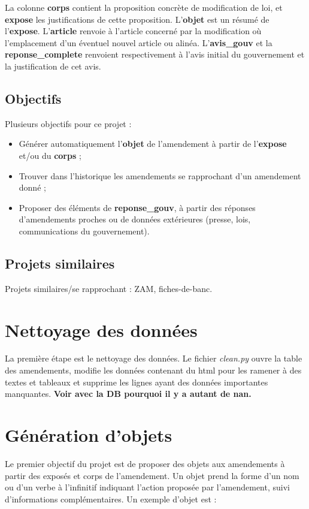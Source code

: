 \documentclass{article}
\begin{document}
La colonne \textbf{corps} contient la proposition concrète de modification de loi, et \textbf{expose} les justifications de cette proposition. L'\textbf{objet} est un résumé de l'\textbf{expose}. 
L'\textbf{article} renvoie à l'article concerné par la modification où l'emplacement d'un éventuel nouvel article ou alinéa.
L'\textbf{avis\_gouv} et la \textbf{reponse\_complete} renvoient respectivement à l'avis initial du gouvernement et la justification de cet avis.


\subsection{Objectifs}
Plusieurs objectifs pour ce projet :
\begin{itemize}
\item  Générer automatiquement l'\textbf{objet} de l'amendement à partir de l'\textbf{expose} et/ou du \textbf{corps} ;
\item Trouver dans l'historique les amendements se rapprochant d'un amendement donné ;
\item  Proposer des éléments de \textbf{reponse\_gouv}, à partir des réponses d'amendements proches ou de données extérieures (presse, lois, communications du gouvernement).
\end{itemize}

\subsection{Projets similaires}
Projets similaires/se rapprochant : ZAM, fiches-de-banc.

\section{Nettoyage des données}
La première étape est le nettoyage des données. Le fichier \emph{clean.py} ouvre la table des amendements, modifie les données contenant du html pour les ramener à des textes et tableaux et supprime les lignes ayant des données importantes manquantes. \textbf{Voir avec la DB pourquoi il y a autant de nan.}
\section{Génération d'objets}

Le premier objectif du projet est de proposer des objets aux amendements à partir des exposés et corps de l'amendement. Un objet prend la forme d'un nom ou d'un verbe à l'infinitif indiquant l'action proposée par l'amendement, suivi d'informations complémentaires. Un exemple d'objet est :
\end{document}
